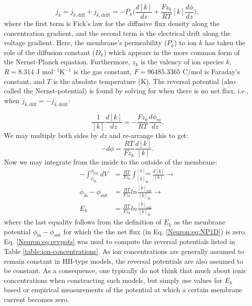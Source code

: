 \begin{equation}
j_k = j_{k,\text{diff}} + j_{k,\text{drift}} 
=  - P_k \Big(\frac{d[k]}{dz} +  \frac{Fz_k}{RT}  [k] \frac{d\phi}{dz} \Big), 
\label{Neuron:eq:NP1D}
\end{equation}
where the first term is Fick's law for the diffusive flux density along the concentration gradient, and the second term is the electrical drift along the voltage gradient. Here, the membrane's permeability ($P_k$) to ion $k$ has taken the role of the diffusion constant ($D_k$) which appears in the more common form of the Nernst-Planck equation. Furthermore, $z_{k}$ is the valency of ion species $k$, $R = 8.314$ J mol$^{-1}$K$^{-1}$ is the gas constant, $F = 96485.3365$ C/mol is Faraday's constant, and $T$ is the absolute temperature (K). The reversal potential (also called the Nernst-potential) is found by solving for when there is no net flux, i.e., when  $j_{k,\text{diff}} = - j_{k,\text{drift}}$:

\begin{equation}
\frac{1}{[k]} \frac{d[k]}{dz} = - \frac{Fz_k}{RT}  \frac{d\phi_m}{dz}.
\end{equation}
We may multiply both sides by $dz$ and re-arrange this to get:
\begin{equation}
-d\phi = \frac{RT}{Fz_k}  \frac{d[k]}{[k]}.
\end{equation}
Now we may integrate from the inside to the outside of the membrane:
\begin{align}
-\int_{\phi_{\text{in}}}^{\phi_{\text{out}}}  dV &= \frac{RT}{Fz_k}  \int_{[k]_{\text{in}}}^{[k]_{\text{out}}} \frac{d[k]}{[k]} \rightarrow \\
\phi_{\text{in}}-\phi_{\text{out}} &= \frac{RT}{Fz_k} ln \frac{[k]_{\text{out}}} {[k]_{\text{in}}} \rightarrow \\
E_k & =  \frac{RT}{Fz_k}  ln \frac{[k]_{\text{out}}} {[k]_{\text{in}}} 
\label{Neuron:eq:revpots}
\end{align}
where the last equality follows from the definition of $E_k$ as the membrane potential $\phi_{\text{in}}-\phi_{\text{out}}$ for which the the net flux (in Eq. \ref{Neuron:eq:NP1D}) is zero. Eq. \ref{Neuron:eq:revpots} was used to compute the reversal potentials listed in Table \ref{table:ion-concentrations}. As ion concentrations are generally assumed to remain constant in HH-type models, the reversal potentials are also assumed to be constant. As a consequence, one typically do not think that much about ionic concentrations when constructing such models, but simply use values for $E_k$ based or empirical measurements of the potential at which a certain membrane current becomes zero.

